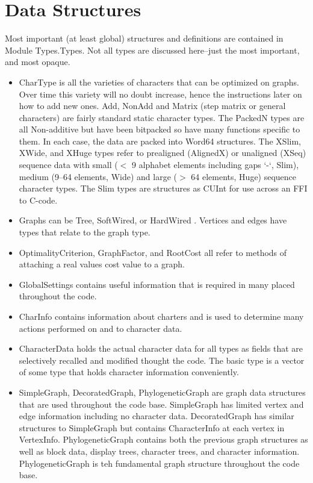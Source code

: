 \documentclass[11pt]{article}
\begin{document}
	\section{Data Structures}
	Most important (at least global) structures and definitions are contained in Module Types.Types.  Not all types are discussed here--just 
	the most important, and most opaque.
	
	\begin{itemize}
		\item {CharType is all the varieties of characters that can be optimized on graphs. Over time this variety will no doubt increase,
		hence the instructions later on how to add new ones. Add, NonAdd and Matrix (step matrix or general characters) are fairly standard 
		static character types.  The PackedN types are all Non-additive but have been bitpacked so have many functions specific to them.  In each case,
		the data are packed into Word64 structures. The XSlim, XWide, and XHuge types refer to prealigned (AlignedX) or unaligned (XSeq) sequence
		data with small ($<$ 9 alphabet elements including gaps `-`, Slim), medium (9--64 elements, Wide) and large ($>$ 64 elements, Huge) 
		sequence character types.  The Slim types are structures as CUInt for use across an FFI to C-code.}
	
		\item{Graphs can be Tree, SoftWired, or HardWired \cite{KannanandWheeler2012,Fischeretal2013, KannanandWheeler2014}.  Vertices and edges have types that relate to the graph type.}
		
		\item{OptimalityCriterion, GraphFactor, and RootCost all refer to methods of attaching a real values cost value to a graph.}
		
		\item{GlobalSettings contains useful information that is required in many placed throughout the code.}
		
		\item{CharInfo contains information about charters and is used to determine many actions performed on and to character data.}
		
		\item{CharacterData holds the actual character data for all types as fields that are selectively recalled and modified 
			thought the code. The basic type is a vector of some type that holds character information conveniently.}
		
		\item{SimpleGraph, DecoratedGraph, PhylogeneticGraph are graph data structures that are used throughout the code base.  
			SimpleGraph has limited vertex and edge information including no character data. DecoratedGraph has similar structures to 
			SimpleGraph but contains CharacterInfo at each vertex in VertexInfo. PhylogeneticGraph contains both the previous graph structures 
			as well as block data, display trees, character trees, and character information.  PhylogeneticGraph is teh fundamental graph structure
			throughout the code base.}
		

\end{itemize}
\end{document}
